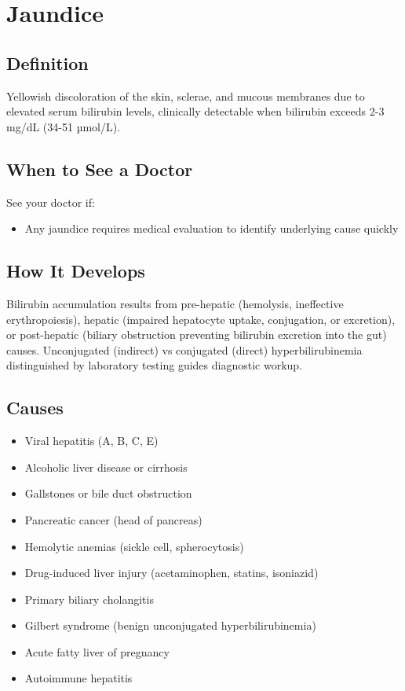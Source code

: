 \chapter{Jaundice}

\section*{Definition}
Yellowish discoloration of the skin, sclerae, and mucous membranes due to elevated serum bilirubin levels, clinically detectable when bilirubin exceeds 2-3 mg/dL (34-51 µmol/L).

\section*{When to See a Doctor}
See your doctor if:
\begin{itemize}
  \item Any jaundice requires medical evaluation to identify underlying cause quickly
\end{itemize}

\section*{How It Develops}
Bilirubin accumulation results from pre-hepatic (hemolysis, ineffective erythropoiesis), hepatic (impaired hepatocyte uptake, conjugation, or excretion), or post-hepatic (biliary obstruction preventing bilirubin excretion into the gut) causes. Unconjugated (indirect) vs conjugated (direct) hyperbilirubinemia distinguished by laboratory testing guides diagnostic workup.

\section*{Causes}
\begin{itemize}
  \item Viral hepatitis (A, B, C, E)
  \item Alcoholic liver disease or cirrhosis
  \item Gallstones or bile duct obstruction
  \item Pancreatic cancer (head of pancreas)
  \item Hemolytic anemias (sickle cell, spherocytosis)
  \item Drug-induced liver injury (acetaminophen, statins, isoniazid)
  \item Primary biliary cholangitis
  \item Gilbert syndrome (benign unconjugated hyperbilirubinemia)
  \item Acute fatty liver of pregnancy
  \item Autoimmune hepatitis
\end{itemize}


